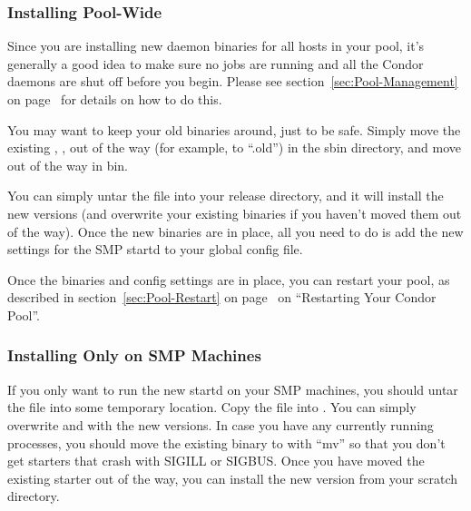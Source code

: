 \subsubsection{\label{sec:SMP-full-install}Installing Pool-Wide}

Since you are installing new daemon binaries for all hosts in your
pool, it's generally a good idea to make sure no jobs are running and
all the Condor daemons are shut off before you begin.
Please see section~\ref{sec:Pool-Management} on
page~\pageref{sec:Pool-Management} for details on how to do this.

You may want to keep your old binaries around, just to be safe.
Simply move the existing , ,
 out of the way (for example, to
``.old'') in the sbin directory, and move
 out of the way in bin.   

You can simply untar the  file into your release 
directory, and it will install the new versions (and overwrite your
existing binaries if you haven't moved them out of the way).
Once the new binaries are in place, all you need to do is add the new
settings for the SMP startd to your global config file.

Once the binaries and config settings are in place, you can restart
your pool, as described in section~\ref{sec:Pool-Restart} on
page~\pageref{sec:Pool-Restart} on ``Restarting Your Condor Pool''. 

\subsubsection{\label{sec:SMP-partial-install}Installing Only on SMP
Machines} 

If you only want to run the new startd on your SMP machines, you
should untar the  file into some temporary location.
Copy the  file into
.
You can simply overwrite  and
 with the new versions.
In case you have any currently running  processes, you
should move the existing binary to  with ``mv'' so
that you don't get starters that crash with SIGILL or SIGBUS.  
Once you have moved the existing starter out of the way, you can
install the new version from your scratch directory.

